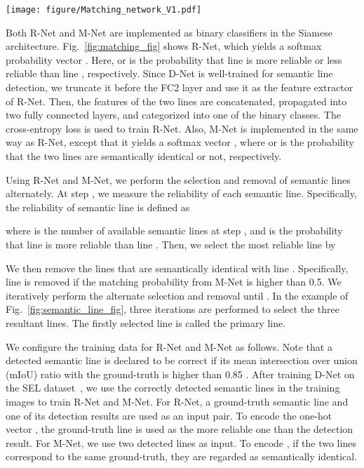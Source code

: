 \documentclass[runningheads]{llncs}
\begin{document}
\begin{figure*}[t]

  \centering
  \texttt{[image: figure/Matching\_network\_V1.pdf]}
\caption{Siamese architecture for R-Net: Given a pair of detected lines from D-Net, R-Net decides whether one line is more reliable or less reliable than the other.}
  \label{fig:matching_fig}
\end{figure*}


Both R-Net and M-Net are implemented as binary classifiers in the Siamese architecture. Fig.~\ref{fig:matching_fig} shows R-Net, which yields a softmax probability vector . Here,  or  is the probability that line  is more reliable or less reliable than line , respectively. Since D-Net is well-trained for semantic line detection, we truncate it before the FC2 layer and use it as the feature extractor of R-Net. Then, the features of the two lines are concatenated, propagated into two fully connected layers, and categorized into one of the binary classes. The cross-entropy loss is used to train R-Net. Also, M-Net is implemented in the same way as R-Net, except that it yields a softmax vector , where  or  is the probability that the two lines are semantically identical or not, respectively.

Using R-Net and M-Net, we perform the selection and removal of semantic lines alternately. At step , we measure the reliability of each semantic line. Specifically, the reliability  of semantic line  is defined as

where  is the number of available semantic lines at step , and  is the probability that line  is more reliable than line . Then, we select the most reliable line  by

We then remove the lines that are semantically identical with line . Specifically, line  is removed if the matching probability  from M-Net is higher than 0.5. We iteratively perform the alternate selection and removal until . In the example of Fig.~\ref{fig:semantic_line_fig}, three iterations are performed to select the three resultant lines. The firstly selected line is called the primary line.

We configure the training data for R-Net and M-Net as follows. Note that a detected semantic line is declared to be correct if its mean intersection over union (mIoU) ratio with the ground-truth is higher than 0.85 \cite{lee2017}. After training D-Net on the SEL dataset~\cite{lee2017}, we use the correctly detected semantic lines in the training images to train R-Net and M-Net. For R-Net, a ground-truth semantic line and one of its detection results are used as an input pair. To encode the one-hot vector , the ground-truth line is used as the more reliable one than the detection result. For M-Net, we use two detected lines as input. To encode , if the two lines correspond to the same ground-truth, they are regarded as semantically identical.
\end{document}
